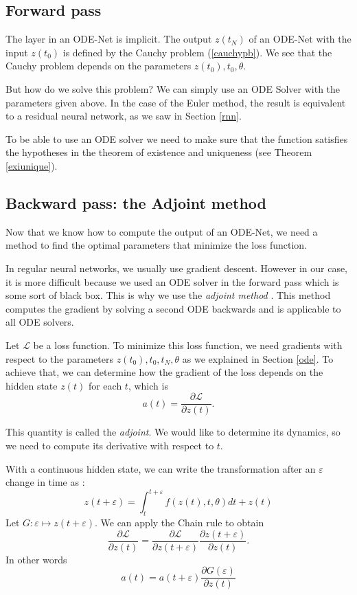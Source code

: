 \documentclass[10pt,a4paper]{article}
\theoremstyle{definition}
\theoremstyle{plain}
\begin{document}
\subsection{Forward pass}

The layer in an ODE-Net is implicit. The output $z(t_N)$ of an ODE-Net with the input $z(t_0)$ is defined by the Cauchy problem (\ref{cauchypb}). We see that the Cauchy problem depends on the parameters $z(t_0),t_0,\theta$.

But how do we solve this problem? We can simply use an ODE Solver with the parameters given above. In the case of the Euler method, the result is equivalent to a residual neural network, as we saw in Section \ref{rnn}.

To be able to use an ODE solver we need to make sure that the function satisfies the hypotheses in the theorem of existence and uniqueness (see Theorem \ref{exiunique}).

\subsection{Backward pass: the Adjoint method}
Now that we know how to compute the output of an ODE-Net, we need a method to find the optimal parameters that minimize the loss function.

In regular neural networks, we usually use gradient descent. However in our case, it is more difficult because we used an ODE solver in the forward pass which is some sort of black box. This is why we use the \textit{adjoint method} \cite{12}. This method computes the gradient by solving a second ODE backwards and is applicable to all ODE solvers.

Let $\mathcal{L}$ be a loss function. To minimize this loss function, we need gradients with respect to the parameters $z(t_0),t_0,t_N,\theta$ as we explained in Section \ref{ode}. To achieve that, we can determine how the gradient of the loss depends on the hidden state $z(t)$ for each $t$, which is
\begin{equation}
a(t)= \frac{\partial \mathcal{L}}{\partial z(t)}.
\end{equation}

This quantity is called the \textit{adjoint}. We would like to determine its dynamics, so we need to compute its derivative with respect to $t$.

With a continuous hidden state, we can write the transformation after an $\varepsilon$ change in time as :
\begin{equation}
\label{zteps}
z(t+\varepsilon) = \int^{t+\varepsilon}_{t} f(z(t),t,\theta) dt + z(t)
\end{equation}
Let $ G : \varepsilon \mapsto z(t+\varepsilon)$. We can apply the Chain rule to obtain
\begin{equation*}
\frac{\partial \mathcal{L}}{\partial z(t)} = \frac{\partial \mathcal{L}}{\partial z(t+\varepsilon)} \frac{\partial z(t+\varepsilon)}{\partial z(t)}.
\end{equation*}
In other words 
\begin{equation}
\label{at}
a(t) = a(t+\varepsilon)\frac{\partial G(\varepsilon)}{\partial z(t)}
\end{equation}
\end{document}
